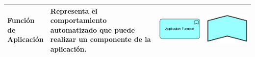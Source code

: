 \begin{longtable}{|p{0.15\linewidth}|p{0.45\linewidth}|p{0.2\linewidth} p{0.2\linewidth}|}
    Función de Aplicación 
    &
    Representa el comportamiento automatizado que puede realizar un componente de la aplicación. 
    &
\begin{center}
    \includegraphics[width=1\linewidth]{imgs/capa_aplicacion/Aplication_function.pdf}
\end{center} &
\begin{center}
    \includegraphics[width=0.7\linewidth]{imgs/capa_aplicacion/function.pdf}
\end{center}
    \\ \hline


\end{longtable}
